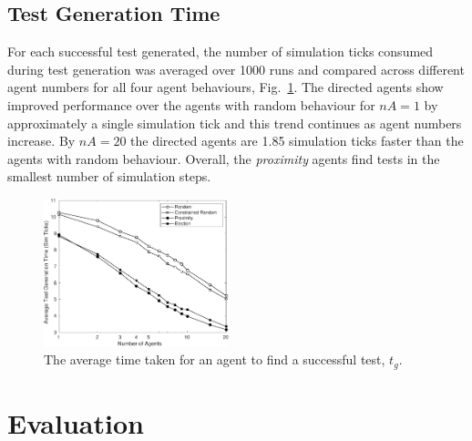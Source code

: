 \documentclass[letterpaper, 10 pt, journal, twoside]{IEEEtran}
\begin{document}
\subsection{Test Generation Time}
For each successful test generated, the number of simulation ticks consumed during test generation was averaged over 1000 runs and compared across different agent numbers for all four agent behaviours, Fig.~\ref{f:time}. 
%
The directed agents show improved performance over the agents with random behaviour for $nA=1$ by approximately a single simulation tick and this trend continues as agent numbers increase. By $nA=20$ the directed agents are 1.85 simulation ticks faster than the agents with random behaviour. Overall, the \textit{proximity} agents find tests in the smallest number of simulation steps.

\begin{figure}[!t]
	\centering
\includegraphics[width=0.48\textwidth]{TimeSimTicks.pdf}
	\caption{The average time taken for an agent to find a successful test, $t_{g}$.}
	\label{f:time}
\end{figure}




\section{Evaluation}\label{s:evaluation}
\end{document}
